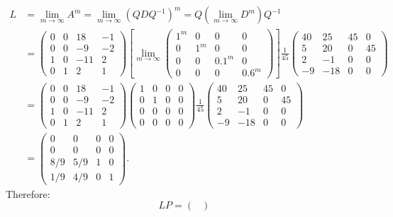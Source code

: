 \documentclass[12pt]{article}
\begin{document}
\begin{enumerate}
\begin{align*}
L &= \lim_{m \to \infty} A^m = \lim_{m \to \infty} (QDQ^{-1})^m = Q (\lim_{m \to \infty} D^m) Q^{-1} \\
&= \begin{pmatrix}
0 & 0 & 18 & -1 \\
0 & 0 & -9 & -2 \\
1 & 0 & -11 & 2 \\
0 & 1 & 2 & 1
\end{pmatrix}
\left[\lim_{m \to \infty} \begin{pmatrix}
1^m & 0 & 0 & 0 \\
0 & 1^m & 0 & 0 \\
0 & 0 & 0.1^m & 0 \\
0 & 0 & 0 & 0.6^m
\end{pmatrix}\right]
\frac{1}{45} \begin{pmatrix}
40 & 25 & 45 & 0 \\
5 & 20 & 0 & 45 \\
2 & -1 & 0 & 0 \\
-9 & -18 & 0 & 0
\end{pmatrix} \\
&= \begin{pmatrix}
0 & 0 & 18 & -1 \\
0 & 0 & -9 & -2 \\
1 & 0 & -11 & 2 \\
0 & 1 & 2 & 1
\end{pmatrix}
\begin{pmatrix}
1 & 0 & 0 & 0 \\
0 & 1 & 0 & 0 \\
0 & 0 & 0 & 0 \\
0 & 0 & 0 & 0
\end{pmatrix}
\frac{1}{45} \begin{pmatrix}
40 & 25 & 45 & 0 \\
5 & 20 & 0 & 45 \\
2 & -1 & 0 & 0 \\
-9 & -18 & 0 & 0
\end{pmatrix} \\
&= \begin{pmatrix}
0 & 0 & 0 & 0 \\
0 & 0 & 0 & 0 \\
8/9 & 5/9 & 1 & 0 \\
1/9 & 4/9 & 0 & 1
\end{pmatrix}.
\end{align*}
Therefore:
\begin{equation*}
LP =  \begin{pmatrix}

\end{pmatrix}
\end{equation*}
\end{enumerate}
\end{document}
